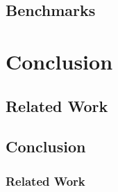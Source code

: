 \documentclass{vutinfth} %
\theoremstyle{example}
\theoremstyle{definition}
\theoremstyle{theorem}
\theoremstyle{lemma}
\theoremstyle{corollary}
\begin{document}
\section{Benchmarks}

\chapter{Conclusion}

\section{Related Work}

\section{Conclusion}

\subsection{Related Work}

\backmatter

\listoffigures %

\listoftables %

\listofalgorithms
{}

\printindex

\printglossaries



\end{document}
